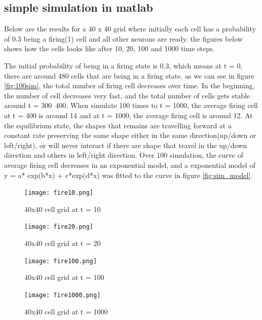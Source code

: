 \documentclass[12pt]{article}
\begin{document}
\subsection{simple simulation in matlab}

Below are the results for a 40 x 40 grid where initially each cell has a probability of 0.3 being a firing(1) cell and all other neurons are ready. the figures below shows how the cells looks like after 10, 20, 100 and 1000 time steps. 

The initial probability of being in a firing state is 0.3, which means at t = 0, there are around 480 cells that are being in a firing state. as we can see in figure \ref{fig:100sim}, the total number of firing cell decreases over time. In the beginning, the number of cell decreases very fast, and the total number of cells gets stable around t = 300~400. When simulate 100 times to t = 1000, the average firing cell at t = 400 is around 14 and at t = 1000, the average firing cell is around 12. At the equilibrium state, the shapes that remains are travelling forward at a constant rate preserving the same shape either in the same direction(up/down or left/right), or will never interact if there are shape that travel in the up/down direction and others in left/right direction. Over 100 simulation, the curve of average firing cell decreases in an exponential model, and a exponential model of y = a* exp(b*x) + c*exp(d*x) was fitted to the curve in figure \ref{fig:sim_model}.


\begin{figure}[H] %
\centering
\texttt{[image: fire10.png]}
\caption{40x40 cell grid at t = 10}
\label{fig:fire10}
\end{figure}

\begin{figure}[H] %
\centering
\texttt{[image: fire20.png]}
\caption{40x40 cell grid at t = 20}
\label{fig:fire20}
\end{figure}

\begin{figure}[H] %
\centering
\texttt{[image: fire100.png]}
\caption{40x40 cell grid at t = 100}
\label{fig:fire100}
\end{figure}

\begin{figure}[H] %
\centering
\texttt{[image: fire1000.png]}
\caption{40x40 cell grid at t = 1000}
\label{fig:fire1000}
\end{figure}
\end{document}
